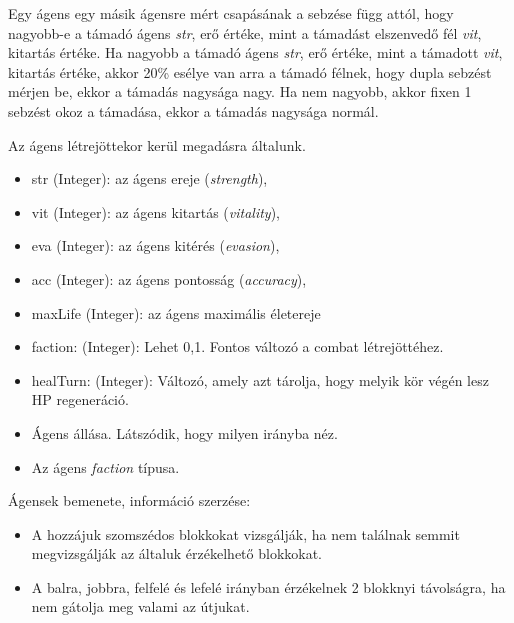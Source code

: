 Egy ágens egy másik ágensre mért csapásának a sebzése függ attól, hogy nagyobb-e a támadó ágens \textit{str}, erő értéke, mint a támadást elszenvedő fél \textit{vit}, kitartás értéke.
Ha nagyobb a támadó ágens \textit{str}, erő értéke, mint a támadott \textit{vit}, kitartás értéke, akkor 20\% esélye van arra a támadó félnek, hogy dupla sebzést mérjen be, ekkor a támadás nagysága nagy.
Ha nem nagyobb, akkor fixen 1 sebzést okoz a támadása, ekkor a támadás nagysága normál.


Az ágens létrejöttekor kerül megadásra általunk.

\begin{itemize}
    \item str (Integer): az ágens ereje (\textit{strength}),
    \item vit (Integer): az ágens kitartás (\textit{vitality}),
    \item eva (Integer): az ágens kitérés (\textit{evasion}),
    \item acc (Integer): az ágens pontosság (\textit{accuracy}),
    \item maxLife (Integer): az ágens maximális életereje
    \item faction: (Integer): Lehet 0,1. Fontos változó a combat létrejöttéhez.
    \item healTurn: (Integer): Változó, amely azt tárolja, hogy melyik kör végén lesz HP regeneráció.
\end{itemize}


\begin{itemize}
    \item Ágens állása. Látszódik, hogy milyen irányba néz.
    \item Az ágens \textit{faction} típusa.
\end{itemize}


Ágensek bemenete, információ szerzése:
\begin{itemize}
    \item A hozzájuk szomszédos blokkokat vizsgálják, ha nem találnak semmit megvizsgálják az általuk érzékelhető blokkokat.
    \item A balra, jobbra, felfelé és lefelé irányban érzékelnek 2 blokknyi távolságra, ha nem gátolja meg valami az útjukat.
\end{itemize}

